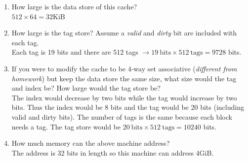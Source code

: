 \documentclass[11pt]{article}
\begin{document}
\begin{enumerate}
\begin{enumerate}
        \item How large is the data store of this cache?\\[1em]
        $512 \times 64 = 32$KiB\\

        \item How large is the tag store? Assume a \textit{valid} and \textit{dirty} bit are included with each tag.\\[1em]
        Each tag is 19 bits and there are 512 tags
        $\rightarrow 19\mathrm{\ bits} \times 512\mathrm{\ tags}=9728$ bits.\\

        \item If you were to modify the cache to be 4-way set associative (\textit{different from homework}) but keep the data store the same size, what size would the tag and index be? How large would the tag store be?\\[1em]
        The index would decrease by two bits while the tag would increase by two bits. Thus the index would be 8 bits and the tag would be 20 bits (including valid and dirty bits). The number of tags is the same because each block needs a tag. The tag store would be $20\mathrm{\ bits} \times 512\mathrm{\ tags}=10240$ bits.\\

        \item How much memory can the above machine address?\\[1em]
        The address is 32 bits in length so this machine can address 4GiB.
    \end{enumerate}
\end{enumerate}
\end{document}
